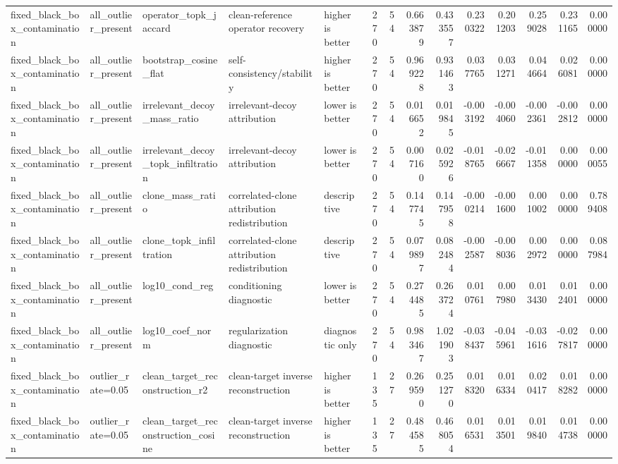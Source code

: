 \begin{table}[t]
\begin{tabular}{lllllrrrrrrrrr}
fixed_black_box_contamination & all_outlier_present & operator_topk_jaccard & clean-reference operator recovery & higher is better & 270 & 54 & 0.663879 & 0.433557 & 0.230322 & 0.201203 & 0.259028 & 0.231165 & 0.000000 \\
fixed_black_box_contamination & all_outlier_present & bootstrap_cosine_flat & self-consistency/stability & higher is better & 270 & 54 & 0.969228 & 0.931463 & 0.037765 & 0.031271 & 0.044664 & 0.026081 & 0.000000 \\
fixed_black_box_contamination & all_outlier_present & irrelevant_decoy_mass_ratio & irrelevant-decoy attribution & lower is better & 270 & 54 & 0.016652 & 0.019845 & -0.003192 & -0.004060 & -0.002361 & -0.002812 & 0.000000 \\
fixed_black_box_contamination & all_outlier_present & irrelevant_decoy_topk_infiltration & irrelevant-decoy attribution & lower is better & 270 & 54 & 0.007160 & 0.025926 & -0.018765 & -0.026667 & -0.011358 & 0.000000 & 0.000055 \\
fixed_black_box_contamination & all_outlier_present & clone_mass_ratio & correlated-clone attribution redistribution & descriptive & 270 & 54 & 0.147745 & 0.147958 & -0.000214 & -0.001600 & 0.001002 & 0.000000 & 0.789408 \\
fixed_black_box_contamination & all_outlier_present & clone_topk_infiltration & correlated-clone attribution redistribution & descriptive & 270 & 54 & 0.079897 & 0.082484 & -0.002587 & -0.008036 & 0.002972 & 0.000000 & 0.087984 \\
fixed_black_box_contamination & all_outlier_present & log10_cond_reg & conditioning diagnostic & lower is better & 270 & 54 & 0.274485 & 0.263724 & 0.010761 & 0.007980 & 0.013430 & 0.012401 & 0.000000 \\
fixed_black_box_contamination & all_outlier_present & log10_coef_norm & regularization diagnostic & diagnostic only & 270 & 54 & 0.983467 & 1.021903 & -0.038437 & -0.045961 & -0.031616 & -0.027817 & 0.000000 \\
fixed_black_box_contamination & outlier_rate=0.05 & clean_target_reconstruction_r2 & clean-target inverse reconstruction & higher is better & 135 & 27 & 0.269590 & 0.251270 & 0.018320 & 0.016334 & 0.020417 & 0.018282 & 0.000000 \\
fixed_black_box_contamination & outlier_rate=0.05 & clean_target_reconstruction_cosine & clean-target inverse reconstruction & higher is better & 135 & 27 & 0.484585 & 0.468054 & 0.016531 & 0.013501 & 0.019840 & 0.014738 & 0.000000 \\

\end{tabular}
\end{table}
